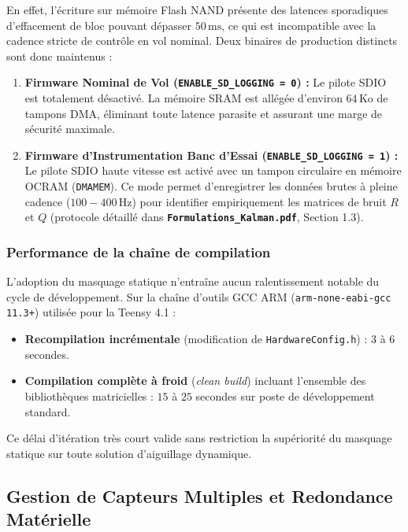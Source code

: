 \documentclass[../Implementation.tex]{subfiles}
\begin{document}
En effet, l'écriture sur mémoire Flash NAND présente des latences sporadiques d'effacement de bloc pouvant dépasser $50\,\text{ms}$, ce qui est incompatible avec la cadence stricte de contrôle en vol nominal. Deux binaires de production distincts sont donc maintenus :
\begin{enumerate}
    \item \textbf{Firmware Nominal de Vol (\lstinline|ENABLE_SD_LOGGING = 0|) :}
    Le pilote SDIO est totalement désactivé. La mémoire SRAM est allégée d'environ $64\,\text{Ko}$ de tampons DMA, éliminant toute latence parasite et assurant une marge de sécurité maximale.
    \item \textbf{Firmware d'Instrumentation Banc d'Essai (\lstinline|ENABLE_SD_LOGGING = 1|) :}
    Le pilote SDIO haute vitesse est activé avec un tampon circulaire en mémoire OCRAM (\lstinline|DMAMEM|). Ce mode permet d'enregistrer les données brutes à pleine cadence ($100 - 400\,\text{Hz}$) pour identifier empiriquement les matrices de bruit $R$ et $Q$ (protocole détaillé dans \textbf{\texttt{Formulations\_Kalman.pdf}}, Section 1.3).
\end{enumerate}

\subsubsection{Performance de la chaîne de compilation}
L'adoption du masquage statique n'entraîne aucun ralentissement notable du cycle de développement. Sur la chaîne d'outils GCC ARM (\lstinline|arm-none-eabi-gcc 11.3+|) utilisée pour la Teensy 4.1 :
\begin{itemize}
    \item \textbf{Recompilation incrémentale} (modification de \lstinline|HardwareConfig.h|) : $3$ à $6$ secondes.
    \item \textbf{Compilation complète à froid} (\textit{clean build}) incluant l'ensemble des bibliothèques matricielles : $15$ à $25$ secondes sur poste de développement standard.
\end{itemize}
Ce délai d'itération très court valide sans restriction la supériorité du masquage statique sur toute solution d'aiguillage dynamique.

\subsection{Gestion de Capteurs Multiples et Redondance Matérielle}
\end{document}
